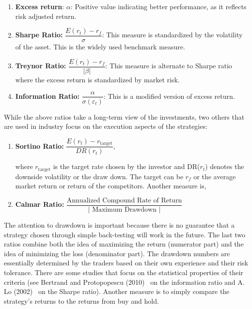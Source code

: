\begin{enumerate}[--]
\item \textbf{Excess return}: $\alpha$: Positive value indicating better performance, as it reflects risk adjusted return. \twomedskip

\item \textbf{Sharpe Ratio: } $\dfrac{E(r_{t}) - r_f}{\sigma}$: This measure is standardized by the volatility of the asset. This is the widely used benchmark measure. \twomedskip

\item \textbf{Treynor Ratio: } $\dfrac{E(r_{t}) - r_f}{\left|\beta \right|}$: This measure is alternate to Sharpe ratio where the excess return is standardized by market risk. \twomedskip

\item \textbf{Information Ratio: } $\dfrac{\alpha}{\sigma(\varepsilon_{t})}$: This is a modified version of excess return.
\end{enumerate}


While the above ratios take a long-term view of the investments, two others that are used in industry focus on the execution aspects of the strategies: 


\begin{enumerate}[--]
\item \textbf{Sortino Ratio: } $\dfrac{E(r_{t}) - r_{\text{target}}}{DR(r_{t})}$, \twomedskip

\noindent where $r_{\text{target}}$ is the target rate chosen by the investor and DR($r_t$) denotes the downside volatility or the draw down. The target can be $r_f$ or the average market return or return of the competitors. Another measure is, \twomedskip

\item \textbf{Calmar Ratio: } $\dfrac{\text{Annualized Compound Rate of Return}}{\left| \text{ Maximum Drawdown }\right|}$ \twomedskip
\end{enumerate}


The attention to drawdown is important because there is no guarantee that a strategy chosen through simple back-testing will work in the future. The last two ratios combine both the idea of maximizing the return (numerator part) and the idea of minimizing the loss (denominator part). The drawdown numbers are essentially determined by the traders based on their own experience and their risk tolerance. There are some studies that focus on the statistical properties of their criteria (see Bertrand and Protopopescu (2010)~\cite{bertrand} on the information ratio and A. Lo (2002)~\cite{awlo} on the Sharpe ratio). Another measure is to simply compare the strategy's returns to the returns from buy and hold.


